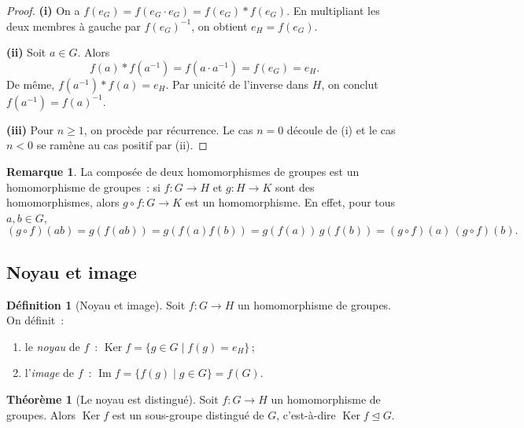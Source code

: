 \documentclass[12pt,a4paper,openany]{book}
\theoremstyle{definition}
\newtheorem{definition}{Définition}[chapter]
\newtheorem{theoreme}{Théorème}[chapter]
\newtheorem{remarque}{Remarque}[chapter]
\DeclareMathOperator{\Ker}{Ker}
\renewcommand{\Im}{\operatorname{Im}}
\begin{document}
\begin{proof}
  \textbf{(i)} On a $f(e_G) = f(e_G\cdot e_G) = f(e_G)\ast f(e_G)$.
  En multipliant les deux membres à gauche par $f(e_G)^{-1}$, on
  obtient $e_H = f(e_G)$.

  \medskip

  \textbf{(ii)} Soit $a\in G$. Alors
  \[
    f(a)\ast f(a^{-1}) = f(a\cdot a^{-1}) = f(e_G) = e_H.
  \]
  De même, $f(a^{-1})\ast f(a) = e_H$. Par unicité de l'inverse dans
  $H$, on conclut $f(a^{-1}) = f(a)^{-1}$.

  \medskip

  \textbf{(iii)} Pour $n\geq 1$, on procède par récurrence. Le cas
  $n=0$ découle de (i) et le cas $n<0$ se ramène au cas positif par
  (ii).
\end{proof}

\begin{remarque}\label{rem:hom-composition}
  La composée de deux homomorphismes de groupes est un homomorphisme de
  groupes~: si $f\colon G\to H$ et $g\colon H\to K$ sont des
  homomorphismes, alors $g\circ f\colon G\to K$ est un homomorphisme.
  En effet, pour tous $a,b\in G$,
  \[
    (g\circ f)(ab) = g(f(ab)) = g(f(a)f(b)) = g(f(a))\,g(f(b))
    = (g\circ f)(a)\,(g\circ f)(b).
  \]
\end{remarque}

\subsection{Noyau et image}\label{subsec:ker-im}

\begin{definition}[Noyau et image]\label{def:ker-im}
  Soit $f\colon G\to H$ un homomorphisme de groupes. On définit~:
  \begin{enumerate}[label=(\roman*)]
    \item le \emph{noyau} de $f$~:
      $\Ker f = \{g\in G \mid f(g) = e_H\}$\,;
    \item l'\emph{image} de $f$~:
      $\Im f = \{f(g) \mid g\in G\} = f(G)$.
  \end{enumerate}
\end{definition}

\begin{theoreme}[Le noyau est distingué]\label{thm:ker-distingue}
  Soit $f\colon G\to H$ un homomorphisme de groupes. Alors
  $\Ker f$ est un sous-groupe distingué de $G$, c'est-à-dire
  $\Ker f \trianglelefteq G$.
\end{theoreme}
\end{document}
